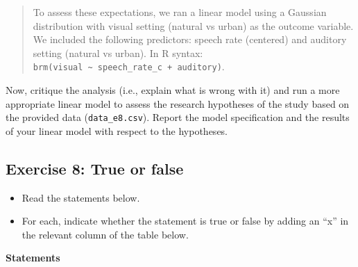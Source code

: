 \documentclass[
]{article}
\providecommand{\tightlist}{%
  \setlength{\itemsep}{0pt}\setlength{\parskip}{0pt}}
\begin{document}
\begin{quote}
To assess these expectations, we ran a linear model using a Gaussian
distribution with visual setting (natural vs urban) as the outcome
variable. We included the following predictors: speech rate (centered)
and auditory setting (natural vs urban). In R syntax:
\texttt{brm(visual\ \textasciitilde{}\ speech\_rate\_c\ +\ auditory)}.
\end{quote}

Now, critique the analysis (i.e., explain what is wrong with it) and run
a more appropriate linear model to assess the research hypotheses of the
study based on the provided data (\texttt{data\_e8.csv}). Report the
model specification and the results of your linear model with respect to
the hypotheses.

\hypertarget{exercise-8-true-or-false}{%
\subsection{Exercise 8: True or false}\label{exercise-8-true-or-false}}

\begin{itemize}
\tightlist
\item
  Read the statements below.
\item
  For each, indicate whether the statement is true or false by adding an
  ``x'' in the relevant column of the table below.
\end{itemize}

\textbf{Statements}
\end{document}

